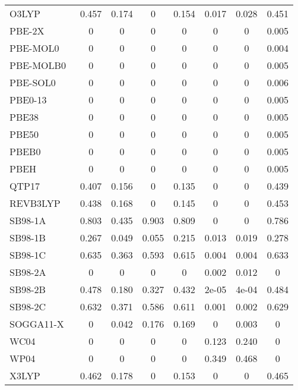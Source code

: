 \begin{table*}
\begin{tabular}{|l|c|c|c|c|c|c|c|}
O3LYP~\cite{Hoe2001_319,Cohen2001_607} & 0.457 & 0.174 & 0 & 0.154 & 0.017 & 0.028 & 0.451 \\
PBE-2X~\cite{Tahchieva2018_4806} & 0 & 0 & 0 & 0 & 0 & 0 & 0.005 \\
PBE-MOL0~\cite{delCampo2012_104108} & 0 & 0 & 0 & 0 & 0 & 0 & 0.004 \\
PBE-MOLB0~\cite{delCampo2012_104108} & 0 & 0 & 0 & 0 & 0 & 0 & 0.005 \\
PBE-SOL0~\cite{delCampo2012_104108} & 0 & 0 & 0 & 0 & 0 & 0 & 0.006 \\
PBE0-13~\cite{Cortona2012_086101} & 0 & 0 & 0 & 0 & 0 & 0 & 0.005 \\
PBE38~\cite{Grimme2010_154104} & 0 & 0 & 0 & 0 & 0 & 0 & 0.005 \\
PBE50~\cite{Bernard2012_204103} & 0 & 0 & 0 & 0 & 0 & 0 & 0.005 \\
PBEB0~\cite{delCampo2012_104108} & 0 & 0 & 0 & 0 & 0 & 0 & 0.005 \\
PBEH~\cite{Adamo1999_6158,Ernzerhof1999_5029} & 0 & 0 & 0 & 0 & 0 & 0 & 0.005 \\
QTP17~\cite{Jin2018_064111} & 0.407 & 0.156 & 0 & 0.135 & 0 & 0 & 0.439 \\
REVB3LYP~\cite{Lu2013_64} & 0.438 & 0.168 & 0 & 0.145 & 0 & 0 & 0.453 \\
SB98-1A~\cite{Schmider1998_9624} & 0.803 & 0.435 & 0.903 & 0.809 & 0 & 0 & 0.786 \\
SB98-1B~\cite{Schmider1998_9624} & 0.267 & 0.049 & 0.055 & 0.215 & 0.013 & 0.019 & 0.278 \\
SB98-1C~\cite{Schmider1998_9624} & 0.635 & 0.363 & 0.593 & 0.615 & 0.004 & 0.004 & 0.633 \\
SB98-2A~\cite{Schmider1998_9624} & 0 & 0 & 0 & 0 & 0.002 & 0.012 & 0 \\
SB98-2B~\cite{Schmider1998_9624} & 0.478 & 0.180 & 0.327 & 0.432 & 2e-05 & 4e-04 & 0.484 \\
SB98-2C~\cite{Schmider1998_9624} & 0.632 & 0.371 & 0.586 & 0.611 & 0.001 & 0.002 & 0.629 \\
SOGGA11-X~\cite{Peverati2011_191102} & 0 & 0.042 & 0.176 & 0.169 & 0 & 0.003 & 0 \\
WC04~\cite{Wiitala2006_1085} & 0 & 0 & 0 & 0 & 0.123 & 0.240 & 0 \\
WP04~\cite{Wiitala2006_1085} & 0 & 0 & 0 & 0 & 0.349 & 0.468 & 0 \\
X3LYP~\cite{Xu2004_2673} & 0.462 & 0.178 & 0 & 0.153 & 0 & 0 & 0.465 \\
\bottomrule
\end{tabular}
\end{table*}
